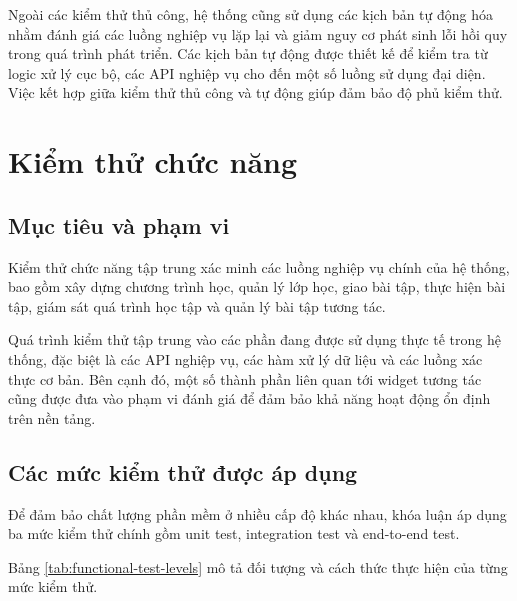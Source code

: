 Ngoài các kiểm thử thủ công, hệ thống cũng sử dụng các kịch bản tự động hóa nhằm đánh giá các luồng nghiệp vụ lặp lại và giảm nguy cơ phát sinh lỗi hồi quy trong quá trình phát triển. Các kịch bản tự động được thiết kế để kiểm tra từ logic xử lý cục bộ, các API nghiệp vụ cho đến một số luồng sử dụng đại diện. Việc kết hợp giữa kiểm thử thủ công và tự động giúp đảm bảo độ phủ kiểm thử.

\section{Kiểm thử chức năng}

\subsection{Mục tiêu và phạm vi}

Kiểm thử chức năng tập trung xác minh các luồng nghiệp vụ chính của hệ thống, bao gồm xây dựng chương trình học, quản lý lớp học, giao bài tập, thực hiện bài tập, giám sát quá trình học tập và quản lý bài tập tương tác.

Quá trình kiểm thử tập trung vào các phần đang được sử dụng thực tế trong hệ thống, đặc biệt là các API nghiệp vụ, các hàm xử lý dữ liệu và các luồng xác thực cơ bản. Bên cạnh đó, một số thành phần liên quan tới widget tương tác cũng được đưa vào phạm vi đánh giá để đảm bảo khả năng hoạt động ổn định trên nền tảng.

\subsection{Các mức kiểm thử được áp dụng}

Để đảm bảo chất lượng phần mềm ở nhiều cấp độ khác nhau, khóa luận áp dụng ba mức kiểm thử chính gồm unit test, integration test và end-to-end test.

Bảng \ref{tab:functional-test-levels} mô tả đối tượng và cách thức thực hiện của từng mức kiểm thử.

